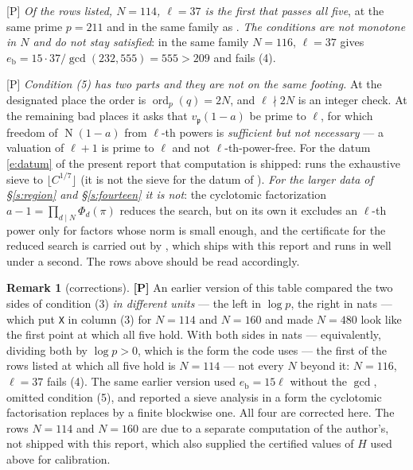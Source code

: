 \documentclass[11pt]{article}
\theoremstyle{plain}
\theoremstyle{definition}
\newtheorem{remark}{Remark}
\newcommand{\ord}{\operatorname{ord}}
\newcommand{\Norm}{\operatorname{N}}
\begin{document}
\textup{[P]} \emph{Of the rows listed, $N=114$, $\ell=37$ is the first that passes all
five}, at the same prime $p=211$ and in the same family as \cite{First}.  \emph{The
conditions are not monotone in $N$ and do not stay satisfied}: in the same family
$N=116$, $\ell=37$ gives $e_{\mathrm b}=15\cdot37/\gcd(232,555)=555>209$ and fails (4).

\textup{[P]} \emph{Condition (5) has two parts and they are not on the same footing.}
At the designated place the order is $\ord_p(q)=2N$, and $\ell\nmid2N$ is an integer
check.  At the remaining bad places it asks that $v_{\mathfrak p}(1-a)$ be prime to
$\ell$, for which freedom of $\Norm(1-a)$ from $\ell$-th powers is \emph{sufficient but
not necessary} --- a valuation of $\ell+1$ is prime to $\ell$ and not $\ell$-th-power-free.  For the datum
\eqref{e:datum} of the present report that computation is shipped:
 runs the exhaustive sieve to $\lfloor C^{1/7}\rfloor$
(it is not the sieve for the datum of \cite{First}).  \emph{For the larger data of
\S\ref{s:region} and \S\ref{s:fourteen} it is not}: the cyclotomic factorization
$a-1=\prod_{d\mid N}\Phi_d(\pi)$ reduces the search, but on its own it excludes an
$\ell$-th power only for factors whose norm is small enough, and the certificate for the
reduced search is carried out by , which ships
with this report and runs in well under a second.  The rows above should be read
accordingly.

\begin{remark}[corrections]
\textbf{[P]} An earlier version of this table compared the two sides of condition (3)
\emph{in different units} --- the left in $\log p$, the right in nats --- which put
\texttt{X} in column (3) for $N=114$ and $N=160$ and made $N=480$ look like the first
point at which all five hold.  With both sides in nats --- equivalently, dividing both
by $\log p>0$, which is the form the code uses --- the first of the rows
listed at which all five hold is $N=114$ --- not every $N$ beyond it: $N=116$,
$\ell=37$ fails (4).  The
same earlier version used $e_{\mathrm b}=15\ell$ without the $\gcd$, omitted condition
(5), and reported a sieve analysis in a form the cyclotomic factorisation replaces by
a finite blockwise one.
All four are corrected here.  The rows $N=114$ and $N=160$ are due to a separate
computation of the author's, not shipped with this report, which also supplied the
certified values of $H$ used above for calibration.
\end{remark}
\end{document}
